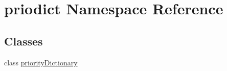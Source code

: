 \hypertarget{namespacepriodict}{\section{priodict Namespace Reference}
\label{namespacepriodict}
}
\subsection*{Classes}
\begin{DoxyCompactItemize}
\item 
class \hyperlink{classpriodict_1_1priorityDictionary}{priority\-Dictionary}
\end{DoxyCompactItemize}
